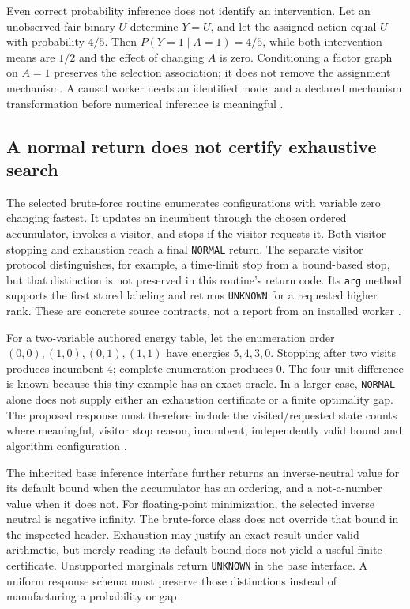 Even correct probability inference does not identify an intervention.
Let an unobserved fair binary $U$ determine $Y=U$, and let the assigned
action equal $U$ with probability $4/5$. Then $P(Y=1\mid A=1)=4/5$, while
both intervention means are $1/2$ and the effect of changing $A$ is zero.
Conditioning a factor graph on $A=1$ preserves the selection association;
it does not remove the assignment mechanism. A causal worker needs an
identified model and a declared mechanism transformation before numerical
inference is meaningful \cite{exec24_opengm_choice}.

\subsection{A normal return does not certify exhaustive search}
The selected brute-force routine enumerates configurations with variable
zero changing fastest. It updates an incumbent through the chosen ordered
accumulator, invokes a visitor, and stops if the visitor requests it. Both
visitor stopping and exhaustion reach a final \texttt{NORMAL} return.
The separate visitor protocol distinguishes, for example, a time-limit stop
from a bound-based stop, but that distinction is not preserved in this
routine's return code. Its \texttt{arg} method supports the first stored
labeling and returns \texttt{UNKNOWN} for a requested higher rank. These
are concrete source contracts, not a report from an installed worker
\cite{exec24_opengm_source}.

For a two-variable authored energy table, let the enumeration order
$(0,0),(1,0),(0,1),(1,1)$ have energies $5,4,3,0$. Stopping after two
visits produces incumbent $4$; complete enumeration produces $0$.
The four-unit difference is known because this tiny example has an exact
oracle. In a larger case, \texttt{NORMAL} alone does not supply either an
exhaustion certificate or a finite optimality gap. The proposed response
must therefore include the visited/requested state counts where meaningful,
visitor stop reason, incumbent, independently valid bound and algorithm
configuration \cite{exec24_opengm_choice}.

The inherited base inference interface further returns an inverse-neutral
value for its default bound when the accumulator has an ordering, and a
not-a-number value when it does not. For floating-point minimization,
the selected inverse neutral is negative infinity. The brute-force class
does not override that bound in the inspected header. Exhaustion may justify
an exact result under valid arithmetic, but merely reading its default bound
does not yield a useful finite certificate. Unsupported marginals return
\texttt{UNKNOWN} in the base interface. A uniform response schema must
preserve those distinctions instead of manufacturing a probability or gap
\cite{exec24_opengm_source}.

